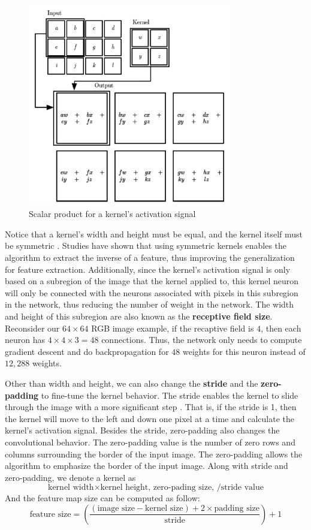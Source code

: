\begin{figure}[!ht]
    \centering
    \includegraphics[width=3.5in]{figures/kernel_operation.png}
    \caption{Scalar product for a kernel's activation signal \cite{lecun2015deep}} 
    \label{fig:kernel_op_diagram}
\end{figure}
%
Notice that a kernel's width and height must be equal, and the kernel itself must be symmetric \cite{o2015introduction}. Studies have shown that using symmetric kernels enables the algorithm to extract the inverse of a feature, thus improving the generalization for feature extraction. Additionally, since the kernel's activation signal is only based on a subregion of the image that the kernel applied to, this kernel neuron will only be connected with the neurons associated with pixels in this subregion in the network, thus reducing the number of weight in the network. The width and height of this subregion are also known as the \textbf{receptive field size}. Reconsider our $64 \times 64$ RGB image example, if the recaptive field is $4$, then each neuron has $4 \times 4 \times 3 = 48$ connections. Thus, the network only needs to compute gradient descent and do backpropagation for $48$ weights for this neuron instead of $12,288$ weights.

Other than width and height, we can also change the \textbf{stride} and the \textbf{zero-padding} to fine-tune the kernel behavior. The stride enables the kernel to slide through the image with a more significant step \cite{o2015introduction}. That is, if the stride is 1, then the kernel will move to the left and down one pixel at a time and calculate the kernel's activation signal. Besides the stride, zero-padding also changes the convolutional behavior. The zero-padding value is the number of zero rows and columns surrounding the border of the input image. The zero-padding allows the algorithm to emphasize the border of the input image. Along with stride and zero-padding, we denote a kernel as 
\[
    \text{kernel width} \times \text{kernel height, zero-pading size, /stride value}
\]
And the feature map size can be computed as follow:
%
\begin{equation} \label{feature_size_eq}
    \text{feature size} = \left(\frac{(\text{image size} - \text{kernel size}) + 2 \times \text{padding size}}{\text{stride}} \right) + 1
\end{equation}

